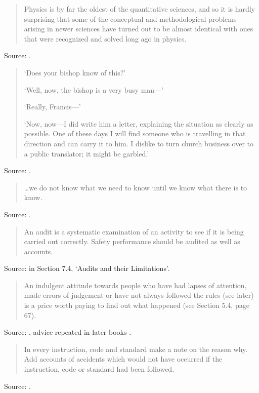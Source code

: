 \documentclass[a4paper]{article}
\begin{document}
\begin{quote}
	Physics is by far the oldest of the quantitative sciences, and so it is hardly surprising that
some of the conceptual and methodological problems arising in newer sciences have turned out to be
almost identical with ones that were recognized and solved long ago in physics.
\end{quote}
Source: \citet[p.~1]{Jaynes1991}.
\medskip

\begin{quotation}
	`Does your bishop know of this?'

	`Well, now, the bishop is a very busy man---'

	`Really, Francis---'

	`Now, now---I did write him a letter, explaining the situation as clearly as possible.  One of
these days I will find someone who is travelling in that direction and can carry it to him.  I
dislike to turn church business over to a public translator; it might be garbled.'
\end{quotation}
Source: \citet[p.~166]{Heinlein1949}.
\medskip

\begin{quote}
	\ldots we do not know what we need to know until we know what there is to know.
\end{quote}
Source: \citet[p.~166]{Kletz1993}.
\medskip

\begin{quote}
	An audit is a systematic examination of an activity to see if it is being carried out
correctly.  Safety performance should be audited as well as accounts.
\end{quote}
Source: \citet[p.96]{Kletz1993} in Section 7.4, `Audits and their Limitations'.
\medskip

\begin{quote}
	An indulgent attitude towards people who have had lapses of attention, made errors of judgement
or have not always followed the rules (see later) is a price worth paying to find out what happened
(see Section 5.4, page 67).
\end{quote}
Source: \citet[p.~106]{Kletz1993}, advice repeated in later books \citep{Kletz2003}.
\medskip

\begin{quote}
	In every instruction, code and standard make a note on the reason why.  Add accounts of
accidents which would not have occurred if the instruction, code or standard had been followed.
\end{quote}
Source: \citet[p.~21]{Kletz1993}.
\medskip
\end{document}
